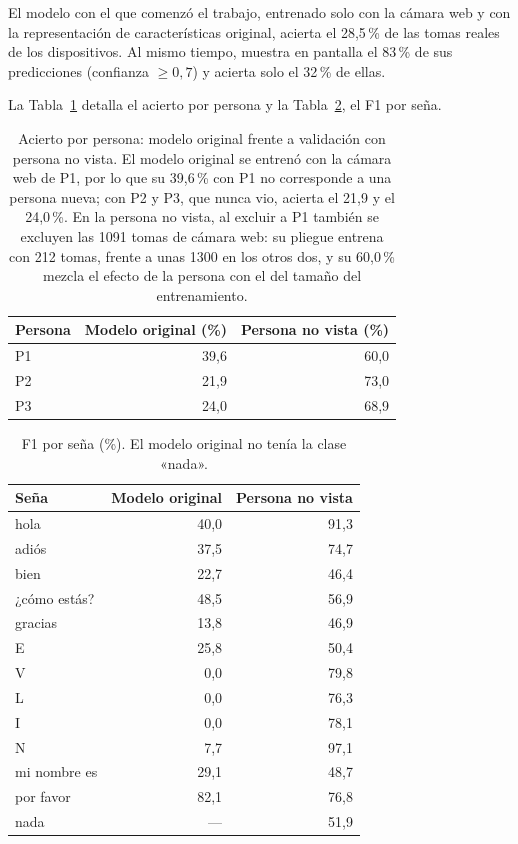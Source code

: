 El modelo con el que comenzó el trabajo, entrenado solo con la cámara web y con la representación de características original, acierta el 28,5\,\% de las tomas reales de los dispositivos. Al mismo tiempo, muestra en pantalla el 83\,\% de sus predicciones (confianza $\geq 0{,}7$) y acierta solo el 32\,\% de ellas.

La Tabla~\ref{tab:por-persona} detalla el acierto por persona y la Tabla~\ref{tab:f1-por-sena}, el F1 por seña.

\begin{table}[h]
    \centering
    \begin{tabular}{lrr}
        \toprule
        Persona & Modelo original (\%) & Persona no vista (\%) \\
        \midrule
        P1 & 39,6 & 60,0 \\
        P2 & 21,9 & 73,0 \\
        P3 & 24,0 & 68,9 \\
        \bottomrule
    \end{tabular}
    \caption{Acierto por persona: modelo original frente a validación con persona no vista. El modelo original se entrenó con la cámara web de P1, por lo que su 39,6\,\% con P1 no corresponde a una persona nueva; con P2 y P3, que nunca vio, acierta el 21,9 y el 24,0\,\%. En la persona no vista, al excluir a P1 también se excluyen las 1091 tomas de cámara web: su pliegue entrena con 212 tomas, frente a unas 1300 en los otros dos, y su 60,0\,\% mezcla el efecto de la persona con el del tamaño del entrenamiento.}
    \label{tab:por-persona}
\end{table}

\begin{table}[h]
    \centering
    \begin{tabular}{lrr}
        \toprule
        Seña & Modelo original & Persona no vista \\
        \midrule
        hola & 40,0 & 91,3 \\
        adiós & 37,5 & 74,7 \\
        bien & 22,7 & 46,4 \\
        ¿cómo estás? & 48,5 & 56,9 \\
        gracias & 13,8 & 46,9 \\
        E & 25,8 & 50,4 \\
        V & 0,0 & 79,8 \\
        L & 0,0 & 76,3 \\
        I & 0,0 & 78,1 \\
        N & 7,7 & 97,1 \\
        mi nombre es & 29,1 & 48,7 \\
        por favor & 82,1 & 76,8 \\
        nada & --- & 51,9 \\
        \bottomrule
    \end{tabular}
    \caption{F1 por seña (\%). El modelo original no tenía la clase «nada».}
    \label{tab:f1-por-sena}
\end{table}

